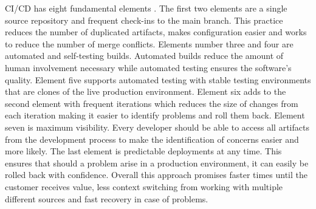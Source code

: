 CI/CD has eight fundamental elements \cite{GIT-CICD}.
The first two elements are a single source repository and frequent check-ins to the main branch.
This practice reduces the number of duplicated artifacts, makes configuration easier and
works to reduce the number of merge conflicts.
Elements number three and four are automated and self-testing builds.
Automated builds reduce the amount of human involvement necessary while automated testing ensures
the software's quality. Element five supports automated testing with stable testing environments
that are clones of the live production environment.
Element six adds to the second element with frequent iterations which reduces the size of changes
from each iteration making it easier to identify problems and roll them back.
Element seven is maximum visibility. Every developer should be able to access all artifacts from
the development process to make the identification of concerns easier and more likely.
The last element is predictable deployments at any time. This ensures that should a problem arise
in a production environment, it can easily be rolled back with confidence.
Overall this approach promises faster times until the customer receives value, less context switching
from working with multiple different sources and fast recovery in case of problems.

